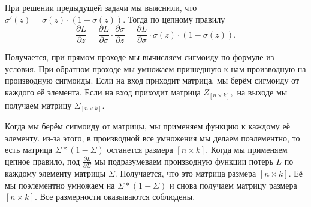 \begin{sol} При решении предыдущей задачи мы выяснили, что $\sigma'(z) = \sigma(z) \cdot (1 - \sigma(z)).$ Тогда по цепному правилу 
\[
\frac{\partial L}{\partial z}  = \frac{\partial L}{\partial \sigma} \cdot \frac{\partial \sigma }{\partial z}  =  \frac{\partial L}{\partial \sigma} \cdot \sigma(z) \cdot (1 - \sigma(z)).
\]

Получается, при прямом проходе мы вычисляем сигмоиду по формуле из условия. При обратном проходе мы умножаем пришедшую к нам производную на производную сигмоиды. Если на вход приходит матрица, мы берём сигмоиду от каждого её элемента. Если на вход приходит матрица $Z_{[n \times k]},$ на выходе мы получаем матрицу $\Sigma_{[n \times k]}.$

Когда мы берём сигмоиду от матрицы, мы применяем функцию к каждому её элементу. из-за этого, в производной все умножения мы делаем поэлементно, то есть матрица $\Sigma * (1 - \Sigma)$ останется размера $[n \times k].$  Когда мы применяем цепное правило, под $\frac{\partial L}{\partial \Sigma}$ мы подразумеваем производную функции потерь $L$ по каждому элементу матрицы $\Sigma$. Получается, что это матрица размера $[n \times k].$ Её мы поэлементно умножаем на $\Sigma * (1 - \Sigma)$ и снова получаем матрицу размера $[n \times k].$ Все размерности оказываются соблюдены.
\end{sol} 


